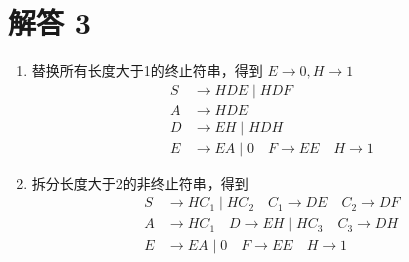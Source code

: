 \documentclass{article}
\begin{document}
	\section*{解答 3}
	
	\begin{enumerate}
		\item 替换所有长度大于1的终止符串，得到 \(E \rightarrow 0, H \rightarrow 1\)
		\begin{align*}
			S &\rightarrow HDE \mid HDF \\
			A &\rightarrow HDE \\
			D &\rightarrow EH \mid HDH \\
			E &\rightarrow EA \mid 0 \quad F \rightarrow EE \quad H \rightarrow 1
		\end{align*}
		
		\item 拆分长度大于2的非终止符串，得到
		\begin{align*}
			S &\rightarrow HC_1 \mid HC_2 \quad C_1 \rightarrow DE \quad C_2 \rightarrow DF \\
			A &\rightarrow HC_1 \quad D \rightarrow EH \mid HC_3 \quad C_3 \rightarrow DH \\
			E &\rightarrow EA \mid 0 \quad F \rightarrow EE \quad H \rightarrow 1
		\end{align*}
	\end{enumerate}
	
\end{document}
